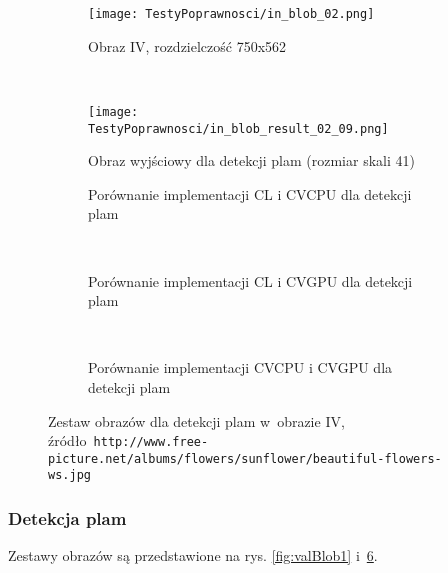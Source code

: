 \begin{figure}[H]
\begin{center}
\begin{subfigure}[t]{0.3\textwidth}
\texttt{[image: TestyPoprawnosci/in\_blob\_02.png]}
\caption{Obraz IV, rozdzielczość 750x562}
\label{fig:valBlob02}
\end{subfigure}
~
\begin{subfigure}[t]{0.3\textwidth}
\texttt{[image: TestyPoprawnosci/in\_blob\_result\_02\_09.png]}
\caption{Obraz wyjściowy dla detekcji plam (rozmiar skali 41)}
\label{fig:valBlobResult02}
\end{subfigure}
\end{center}


\begin{subfigure}[t]{0.3\textwidth}
	\centering
	\setlength\fboxsep{0pt}
	\setlength\fboxrule{0.5pt}
	\caption{Porównanie implementacji CL i CVCPU dla detekcji plam}
	\label{fig:valBlob3CLCVCPU}
\end{subfigure}
~
\begin{subfigure}[t]{0.3\textwidth}
	\centering
	\setlength\fboxsep{0pt}
	\setlength\fboxrule{0.5pt}
	\caption{Porównanie implementacji CL i CVGPU dla detekcji plam}
	\label{fig:valBlob3CLCVGPU}
\end{subfigure}
~
\begin{subfigure}[t]{0.3\textwidth}
	\centering
	\setlength\fboxsep{0pt}
	\setlength\fboxrule{0.5pt}
	\caption{Porównanie implementacji CVCPU i CVGPU dla detekcji plam}
	\label{fig:valBlob3CVCPUCVGPU}                 
\end{subfigure}
\caption{Zestaw obrazów dla detekcji plam w~obrazie IV, \tiny{źródło~\texttt{http://www.free-picture.net/albums/flowers/sunflower/beautiful-flowers-ws.jpg}}}

\label{fig:valBlob2}
\end{figure}

\subsubsection{Detekcja plam}
\label{subsubsec:plamyRysunki}

Zestawy obrazów są przedstawione na rys. \ref{fig:valBlob1} i~\ref{fig:valBlob2}. 

